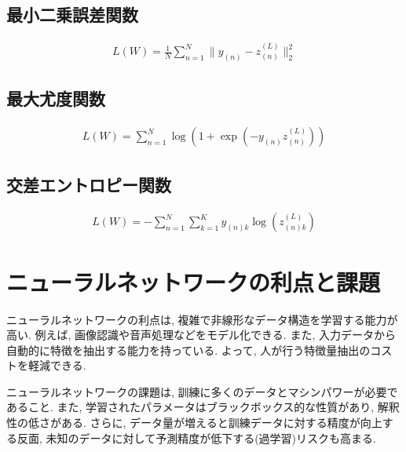 \documentclass[dvipdfmx, 10pt]{jsarticle}
\begin{document}
\begin{framed}
    
\subsection*{最小二乗誤差関数}
\begin{align*}
    L(W) = \frac{1}{N} \sum_{n=1}^N \| y_{(n)} - z^{(L)}_{(n)} \|_2^2
\end{align*}

\subsection*{最大尤度関数}
\begin{align*}
    L(W) = \sum_{n=1}^N \log(1 + \exp(-y_{(n)} z^{(L)}_{(n)}))
\end{align*}

\subsection*{交差エントロピー関数}
\begin{align*}
    L(W) = -\sum_{n=1}^N \sum_{k=1}^K y_{(n)k} \log(z^{(L)}_{(n)k})
\end{align*}
\end{framed}

\section*{ニューラルネットワークの利点と課題}
ニューラルネットワークの利点は, 複雑で非線形なデータ構造を学習する能力が高い. 例えば, 画像認識や音声処理などをモデル化できる. 
また, 入力データから自動的に特徴を抽出する能力を持っている. よって, 人が行う特徴量抽出のコストを軽減できる. 

ニューラルネットワークの課題は, 訓練に多くのデータとマシンパワーが必要であること. 
また, 学習されたパラメータはブラックボックス的な性質があり, 解釈性の低さがある. 
さらに, データ量が増えると訓練データに対する精度が向上する反面, 未知のデータに対して予測精度が低下する(過学習)リスクも高まる. 
\end{document}
